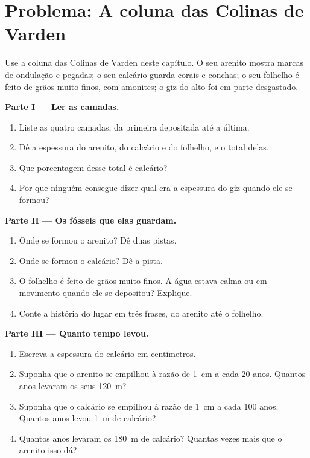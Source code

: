 \section{Problema: A coluna das Colinas de Varden}

\begin{problem}
\label{pb:g7:sediments-and-fossils:1}
Use a coluna das Colinas de Varden deste capítulo. O seu arenito mostra
marcas de ondulação e pegadas; o seu calcário guarda corais e conchas; o
seu folhelho é feito de grãos muito finos, com amonites; o giz do alto
foi em parte desgastado.

\medskip
\noindent\textbf{Parte I --- Ler as camadas.}\par\nopagebreak
\begin{enumerate}[beginpenalty=10000]
  \item Liste as quatro camadas, da primeira depositada até a última.
  \item Dê a espessura do arenito, do calcário e do folhelho, e o total
        delas.
  \item Que porcentagem desse total é calcário?
  \item Por que ninguém consegue dizer qual era a espessura do giz quando
        ele se formou?
\end{enumerate}

\medskip
\noindent\textbf{Parte II --- Os fósseis que elas guardam.}\par\nopagebreak
\begin{enumerate}[resume, beginpenalty=10000]
  \item Onde se formou o arenito? Dê duas pistas.
  \item Onde se formou o calcário? Dê a pista.
  \item O folhelho é feito de grãos muito finos. A água estava calma ou em
        movimento quando ele se depositou? Explique.
  \item Conte a história do lugar em três frases, do arenito até o
        folhelho.
\end{enumerate}

\medskip
\noindent\textbf{Parte III --- Quanto tempo levou.}\par\nopagebreak
\begin{enumerate}[resume, beginpenalty=10000]
  \item Escreva a espessura do calcário em centímetros.
  \item Suponha que o arenito se empilhou à razão de \qty{1}{cm} a cada 20
        anos. Quantos anos levaram os seus \qty{120}{m}?
  \item Suponha que o calcário se empilhou à razão de \qty{1}{cm} a cada
        100 anos. Quantos anos levou \qty{1}{m} de calcário?
  \item Quantos anos levaram os \qty{180}{m} de calcário? Quantas vezes
        mais que o arenito isso dá?
\end{enumerate}
\end{problem}

